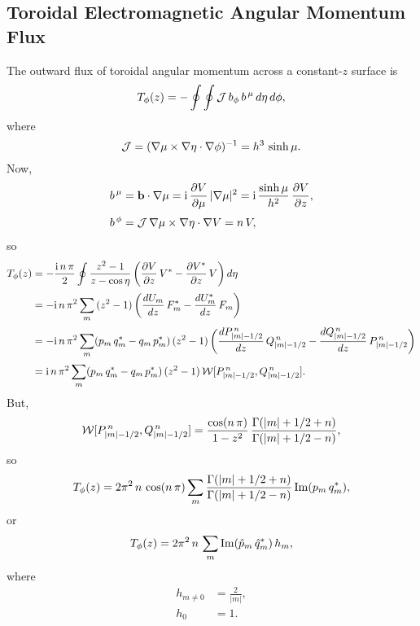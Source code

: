 \documentclass[12pt,prb,aps,notitlepage]{revtex4-1}
\begin{document}
\subsection{Toroidal Electromagnetic Angular Momentum Flux}
The outward flux of toroidal angular momentum across a constant-$z$ surface is
\begin{align}
T_\phi(z) = -\oint\oint {\cal J} \,b_\phi\,b^{\,\mu}\,d\eta\,d\phi,
\end{align}
where
\begin{equation}
{\cal J} = (\nabla\mu\times\nabla\eta\cdot\nabla\phi)^{-1} = h^3\,\sinh\mu.
\end{equation}
Now,
\begin{align}
b^{\,\mu} &= {\bf b}\cdot\nabla\mu = {\rm i}\,\frac{\partial V}{\partial \mu}\,|\nabla\mu|^2 = {\rm i}\,\frac{\sinh\mu}{h^2}\,\frac{\partial V}{\partial z},\\[0.5ex]
b^{\,\phi}&= {\cal J}\,\nabla\mu\times\nabla \eta\cdot\nabla V = n\,V,
\end{align}
so
\begin{align}
T_\phi(z) &= -\frac{{\rm i}\,n\,\pi}{2}\oint \frac{z^2-1}{z-\cos\eta}\left(\frac{\partial V}{\partial z}\,V^\ast -\frac{\partial V^{\ast}}{\partial z}\,V\right)d\eta\nonumber\\[0.5ex]
&= - {\rm i}\,n\,\pi^2\sum_{m}\, (z^2-1)\left(\frac{dU_m}{dz}\,F_{m}^\ast -\frac{dU_m^\ast}{dz}\,F_{m}\right)\nonumber\\[0.5ex]
&= -{\rm i}\,n\,\pi^2\sum_{m}(p_m\,q_m^\ast-q_m\,p_m^{\ast})\,(z^2-1)\left(\frac{dP_{|m|-1/2}^{\,n}}{dz}\,Q_{|m|-1/2}^{\,n}- \frac{dQ_{|m|-1/2}^{\,n}}{dz}\,P_{|m|-1/2}^{\,n}\right)\nonumber\\[0.5ex]
& ={\rm i}\,n\,\pi^2\sum_{m}(p_m\,q_m^\ast-q_m\,p_m^{\ast})\,(z^2-1)\,{\cal W}[P_{|m|-1/2}^{\,n},Q_{|m|-1/2}^{\,n}].
\end{align}
But,
\begin{equation}
{\cal W}[P_{|m|-1/2}^{\,n},Q_{|m|-1/2}^{\,n}]= \frac{\cos(n\,\pi)}{1-z^2}\,\frac{\Gamma(|m|+1/2+n)}{\Gamma(|m|+1/2-n)},
\end{equation}
so
\begin{equation}
T_\phi(z) = 2\pi^2\,n\,\cos(n\,\pi)\sum_m\frac{\Gamma(|m|+1/2+n)}{\Gamma(|m|+1/2-n)}\,{\rm Im}(p_m\,q_m^\ast),
\end{equation}
or
\begin{equation}
T_\phi(z) = 2\pi^2\,n\,\sum_m{\rm Im}(\hat{p}_m\,\hat{q}_m^\ast)\,h_m,
\end{equation}
where
\begin{align}
h_{m\neq 0} &= \frac{2}{|m|},\\[0.5ex]
h_0 & = 1.
\end{align}
\end{document}

